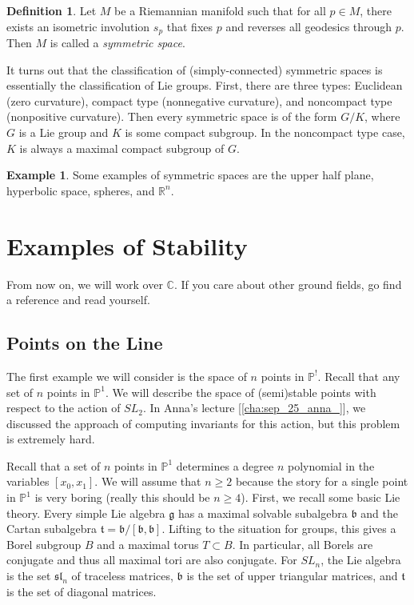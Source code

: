 \documentclass[leqno, openany]{memoir}
\theoremstyle{definition}
\newtheorem{defn}[thm]{Definition}
\newtheorem{exm}[thm]{Example}
\theoremstyle{remark}
\theoremstyle{plain}
\theoremstyle{definition}
\theoremstyle{remark}
\newcommand{\R}{\mathbb{R}}
\newcommand{\C}{\mathbb{C}}
\renewcommand{\P}{\mathbb{P}}
\newcommand{\mf}[1]{\mathfrak{#1}}
\begin{document}
\begin{defn}
    Let $M$ be a Riemannian manifold such that for all $p \in M$, there exists an isometric involution $s_p$ that fixes $p$ and reverses all geodesics through $p$. Then $M$ is called a \textit{symmetric space}. 
\end{defn}

It turns out that the classification of (simply-connected) symmetric spaces is essentially the classification of Lie groups. First, there are three types: Euclidean (zero curvature), compact type (nonnegative curvature), and noncompact type (nonpositive curvature). Then every symmetric space is of the form $G/K$, where $G$ is a Lie group and $K$ is some compact subgroup. In the noncompact type case, $K$ is always a maximal compact subgroup of $G$.

\begin{exm}
    Some examples of symmetric spaces are the upper half plane, hyperbolic space, spheres, and $\R^n$.
\end{exm}

\section{Examples of Stability}%
\label{sec:examples_of_stability}

From now on, we will work over $\C$. If you care about other ground fields, go find a reference and read yourself.

\subsection{Points on the Line}%
\label{sub:points_on_the_line}

The first example we will consider is the space of $n$ points in $\P^!$. Recall that any set of $n$ points in $\P^1$. We will describe the space of (semi)stable points with respect to the action of $SL_2$. In Anna's lecture [\autoref{cha:sep_25_anna_}], we discussed the approach of computing invariants for this action, but this problem is extremely hard.

Recall that a set of $n$ points in $\P^1$ determines a degree $n$ polynomial in the variables $[x_0,x_1]$. We will assume that $n \geq 2$ because the story for a single point in $\P^1$ is very boring (really this should be $n \geq 4$). First, we recall some basic Lie theory. Every simple Lie algebra $\mf{g}$ has a maximal solvable subalgebra $\mf{b}$ and the Cartan subalgebra $\mf{t} = \mf{b} / [\mf{b},\mf{b}]$. Lifting to the situation for groups, this gives a Borel subgroup $B$ and a maximal torus $T \subset B$. In particular, all Borels are conjugate and thus all maximal tori are also conjugate. For $SL_n$, the Lie algebra is the set $\mf{sl}_n$ of traceless matrices, $\mf{b}$ is the set of upper triangular matrices, and $\mf{t}$ is the set of diagonal matrices.
\end{document}
